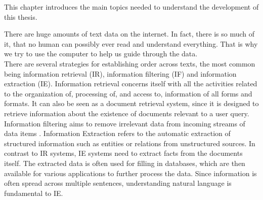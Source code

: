 This chapter introduces the main topics needed to understand the development of this thesis.

There are huge amounts of text data on the internet. In fact, there is so much of it, that no human can possibly ever read and understand everything. That is why we try to use the computer to help us guide through the data. \\
There are several strategies for establishing order across texts, the most common being information retrieval (IR), information filtering (IF) and information extraction (IE)\cite{IE}. Information retrieval concerns itself with all the activities related to the organization of, processing of, and access to, information of all forms and formats. It can also be seen as a document retrieval system, since it is designed to retrieve information about the existence of documents relevant to a user query\cite{chowdhury2010IR}. Information filtering aims to remove irrelevant data from incoming streams of data items \cite{hanani2001IF}. Information Extraction refers to the automatic extraction of structured information such as entities or relations from unstructured sources\cite{sarawagi2008IE}. In contrast to IR systems, IE systems need to extract facts from the documents itself. The extracted data is often used for filling in databases, which are then available for various applications to further process the data\cite{klügl2014IE}. Since information is often spread across multiple sentences, understanding natural language is fundamental to IE\cite{IETaC}.